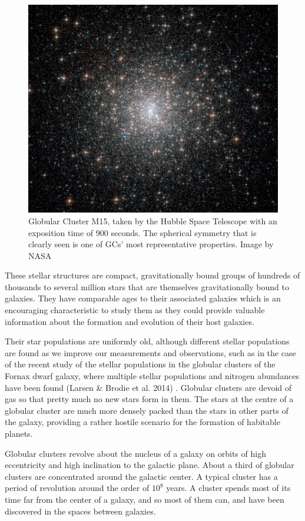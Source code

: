 \begin{figure}[H]
\centering
\includegraphics[width=12cm]{images/m15.jpg}
\caption[M15 Globular cluster]{Globular Cluster M15, taken by the Hubble Space Telescope with an exposition time of 900 seconds. The spherical symmetry  that is clearly seen is one of GCs' most representative properties. Image by NASA}
\end{figure}

These stellar structures are compact, gravitationally bound groups of hundreds of thousands to several million stars that are themselves gravitationally bound to galaxies. They have comparable ages to their associated galaxies which is an encouraging characteristic to study them as they could provide valuable information about the formation and evolution of their host galaxies.

Their star populations are uniformly old, although different stellar populations are found as we improve our measurements and observations, such as in the case of the recent study of the stellar populations in the globular clusters of the Fornax dwarf galaxy, where multiple stellar populations and nitrogen abundances have been found (Larsen \& Brodie et al. 2014) \cite{15}. Globular clusters are devoid of gas so that pretty much no new stars form in them. The stars at the centre of a globular cluster are much more densely packed than the stars in other parts of the galaxy, providing a rather hostile scenario for the formation of habitable planets.

Globular clusters revolve about the nucleus of a galaxy on orbits of high eccentricity and high inclination to the galactic plane. About a third of globular clusters are concentrated around the galactic center. A typical cluster has a period of revolution around the order of $ 10^{8} $ years. A cluster spends most of its time far from the center of a galaxy, and so most of them can, and have been discovered in the spaces between galaxies. 


